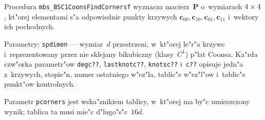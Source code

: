 \vspace{\bigskipamount}
\begin{sloppypar}
Procedura \texttt{mbs\_BSC1CoonsFindCornersf} wyznacza macierz~$\bm{P}$
o~wymiarach $4\times\nobreak 4$, kt"orej elementami s"a odpowiednie punkty
krzywych $\bm{c}_{00},\bm{c}_{10},\bm{c}_{01},\bm{c}_{11}$ i~wektory ich  
pochodnych.%
\end{sloppypar}

Parametry: \texttt{spdimen} --- wymiar~$d$ przestrzeni, w~kt"orej le"r"a
krzywe i~reprezentowany przez nie sklejany bikubiczny (klasy~$C^1$) 
p"lat Coonsa. Ka"rda czw"orka parametr"ow \texttt{degc??},
\texttt{lastknotc??}, \texttt{knotsc??} i~\texttt{c??}    
opisuje jedn"a z~krzywych, stopie"n, numer ostatniego w"ez"la, tablic"e
w"ez"l"ow i~tablic"e punkt"ow kontrolnych.    

Parametr \texttt{pcorners} jest wska"znikiem tablicy, w~kt"orej ma by"c
umieszczony wynik; tablica ta musi mie"c d"lugo"s"c~$16d$.


